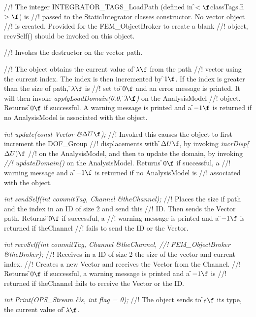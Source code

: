 //! The integer INTEGRATOR\_TAGS\_LoadPath (defined in \f$<\f$classTags.h\f$>\f$) is
//! passed to the StaticIntegrator classes constructor. No vector object
//! is created. Provided for the FEM\_ObjectBroker to create a blank
//! object, recvSelf() should be invoked on this object.

//! Invokes the destructor on the vector \p path.

//! The object obtains the current value of \f$\lambda\f$ from the \p path
//! vector using the current index. The index is then incremented by
\f$1\f$. If the index is greater than the size of \p path, \f$\lambda\f$ is
//! set to \f$0\f$ and an error message is printed. It will then invoke
{\em applyLoadDomain(0.0, \f$\lambda\f$)} on the AnalysisModel
//! object. Returns \f$0\f$ if successful. A warning message is printed and a
\f$-1\f$ is returned if no AnalysisModel is associated with the object.

{\em int update(const Vector \&\f$\Delta U\f$);}
//! Invoked this causes the object to first increment the DOF\_Group
//! displacements with \f$\Delta U\f$, by invoking {\em incrDisp(\f$\Delta U)\f$}
//! on the AnalysisModel, and then to update the domain, by invoking {\em
//! updateDomain()} on the AnalysisModel. Returns \f$0\f$ if successful, a
//! warning message and a \f$-1\f$ is returned if no AnalysisModel is
//! associated with the object.


{\em int sendSelf(int commitTag, Channel \&theChannel); } 
//! Places the size if \p path and the index in an ID of size 2 and send this
//! ID. Then sends the Vector \p path. Returns \f$0\f$ if successful, a
//! warning message is printed and a \f$-1\f$ is returned if \p theChannel
//! fails to send the ID or the Vector. 

{\em int recvSelf(int commitTag, Channel \&theChannel, 
//! FEM\_ObjectBroker \&theBroker); } 
//! Receives in a ID of size 2 the size of the vector and current index.
//! Creates a new Vector and receives the Vector from the Channel. 
//! Returns \f$0\f$ if successful, a warning message is printed and a \f$-1\f$ is
//! returned if \p theChannel fails to receive the Vector or the ID.

{\em int Print(OPS\_Stream \&s, int flag = 0);}
//! The object sends to \f$s\f$ its type, the current value of \f$\lambda\f$.
